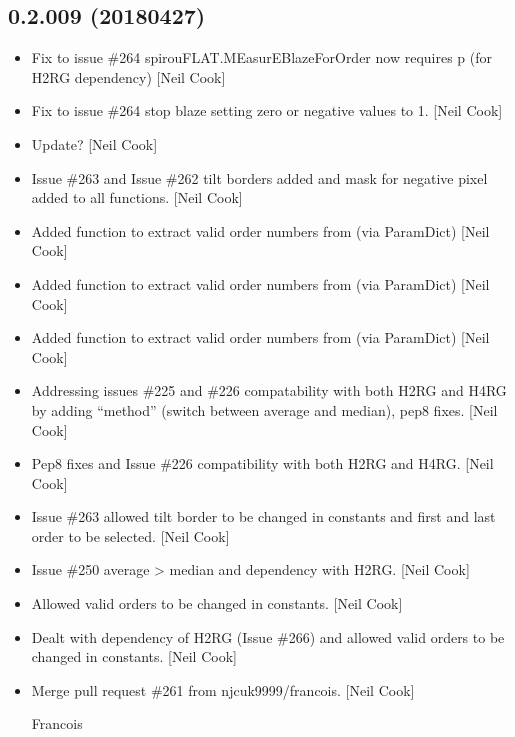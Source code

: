 \documentclass[a4paper,10pt,english]{report}
\begin{document}
\subsection{0.2.009 (2018\sphinxhyphen{}04\sphinxhyphen{}27)}
\label{\detokenize{misc/changelog:id469}}\begin{itemize}
\item {} 
Fix to issue \#264 \sphinxhyphen{} spirouFLAT.MEasurEBlazeForOrder now requires p
(for H2RG dependency) {[}Neil Cook{]}

\item {} 
Fix to issue \#264 \sphinxhyphen{} stop blaze setting zero or negative values to 1.
{[}Neil Cook{]}

\item {} 
Update? {[}Neil Cook{]}

\item {} 
Issue \#263 and Issue \#262 \sphinxhyphen{} tilt borders added and mask for negative
pixel added to all functions. {[}Neil Cook{]}

\item {} 
Added function to extract valid order numbers from 
(via ParamDict) {[}Neil Cook{]}

\item {} 
Added function to extract valid order numbers from 
(via ParamDict) {[}Neil Cook{]}

\item {} 
Added function to extract valid order numbers from 
(via ParamDict) {[}Neil Cook{]}

\item {} 
Addressing issues \#225 and \#226 \sphinxhyphen{} compatability with both H2RG and
H4RG by adding “method” (switch between average and median), pep8
fixes. {[}Neil Cook{]}

\item {} 
Pep8 fixes and Issue \#226 \sphinxhyphen{} compatibility with both H2RG and H4RG.
{[}Neil Cook{]}

\item {} 
Issue \#263 \sphinxhyphen{} allowed tilt border to be changed in constants and first
and last order to be selected. {[}Neil Cook{]}

\item {} 
Issue \#250 \sphinxhyphen{} average \textendash{}\textgreater{} median and dependency with H2RG. {[}Neil Cook{]}

\item {} 
Allowed valid orders to be changed in constants. {[}Neil Cook{]}

\item {} 
Dealt with dependency of H2RG (Issue \#266) and allowed valid orders to
be changed in constants. {[}Neil Cook{]}

\item {} 
Merge pull request \#261 from njcuk9999/francois. {[}Neil Cook{]}

Francois

\end{itemize}
\end{document}

